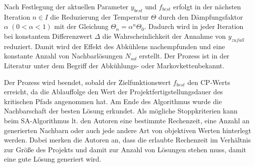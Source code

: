 \documentclass[a4paper,12pt,normalheadings,footexclude,headinclude,liststotoc,nochapterprefix,onecolumn,oneside,parskip,pointlessnumbers]{scrreprt}
\begin{document}
Nach Festlegung der aktuellen Parameter $y_{best}$ und $f_{best}$ erfolgt in der nächsten Iteration $n \in I$ die Reduzierung der Temperatur $\Theta$ durch den Dämpfungsfaktor $\alpha\;(0<\alpha<1)$ mit der Gleichung $\Theta_{n}=\alpha^{n}\Theta_{0}$. Dadurch wird in jeder Iteration bei konstantem Differenzwert $\Delta$ die Wahrscheinlichkeit der Annahme von $y_{zufall}$ reduziert. Damit wird der Effekt des Abkühlens nachempfunden und eine konstante Anzahl von Nachbarlösungen $N_{sol}$ erstellt. Der Prozess ist in der Literatur unter dem Begriff der \glqq Abkühlungs- oder Markovketten\grqq\;bekannt.



Der Prozess wird beendet, sobald der Zielfunktionswert $f_{best}$ den CP-Werts erreicht, da die Ablauffolge den Wert der Projektfertigstellungsdauer des kritischen Pfads angenommen hat. Am Ende des Algorithmus wurde die Nachbarschaft der besten Lösung erkundet. Als mögliche Stoppkriterien kann beim SA-Algorithmus lt. den Autoren eine bestimmte Rechenzeit, eine Anzahl an generierten Nachbarn oder auch jede andere Art von objektiven Werten hinterlegt werden. Dabei merken die Autoren an, dass die erlaubte Rechenzeit im Verhältnis zur Größe des Projekts und damit zur Anzahl von Lösungen stehen muss, damit eine gute Lösung generiert wird.
\end{document}

